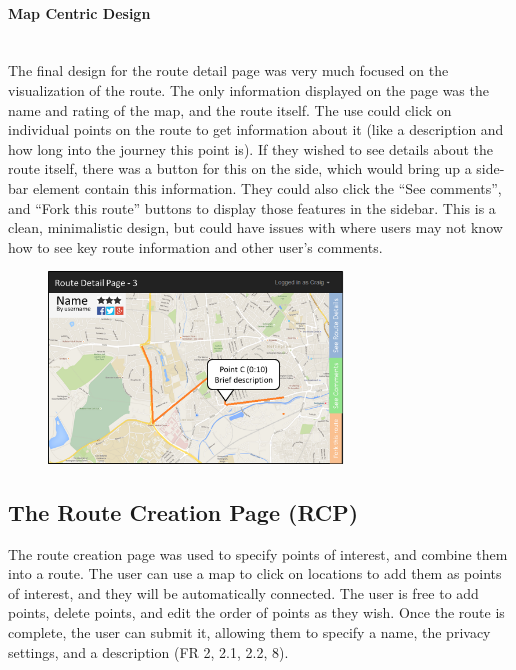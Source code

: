 \newpage 
\paragraph{Map Centric Design}\ \\
The final design for the route detail page was very much focused on the visualization of the route. The only information displayed on the page was the name and rating of the map, and the route itself. The use could click on individual points on the route to get information about it (like a description and how long into the journey this point is). If they wished to see details about the route itself, there was a button for this on the side, which would bring up a side-bar element contain this information. They could also click the ``See comments'', and ``Fork this route'' buttons to display those features in the sidebar. This is a clean, minimalistic design, but could have issues with where users may not know how to see key route information and other user's comments.
\begin{figure}[!ht]
	\begin{center}
		\includegraphics[width=0.7\textwidth]{images/ui-detail-3.png}
	\end{center}
	\vspace{-6mm}
\end{figure}

\subsection{The Route Creation Page (RCP)}
The route creation page was used to specify points of interest, and combine them into a route. The user can use a map to click on locations to add them as points of interest, and they will be automatically connected. The user is free to add points, delete points, and edit the order of points as they wish. Once the route is complete, the user can submit it, allowing them to specify a name, the privacy settings, and a description (FR 2, 2.1, 2.2, 8).


